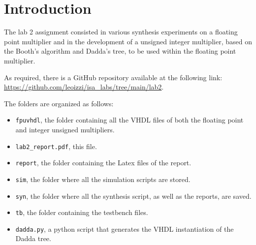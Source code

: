 \chapter{Introduction}

The lab 2 assignment consisted in various synthesis experiments on a floating point multiplier and in the development of a unsigned integer multiplier,
based on the Booth's algorithm and Dadda's tree, to be used within the floating point multiplier.

As required, there is a GitHub repository available at the following link: \url{https://github.com/leoizzi/isa_labs/tree/main/lab2}.

The folders are organized as follows:

\begin{itemize}
    \item \verb|fpuvhdl|, the folder containing all the VHDL files of both the floating point and integer unsigned multipliers.
    \item \verb|lab2_report.pdf|, this file.
    \item \verb|report|, the folder containing the Latex files of the report.
    \item \verb|sim|, the folder where all the simulation scripts are stored.
    \item \verb|syn|, the folder where all the synthesis script, as well as the reports, are saved.
    \item \verb|tb|, the folder containing the testbench files.
    \item \verb|dadda.py|, a python script that generates the VHDL instantiation of the Dadda tree.
\end{itemize}